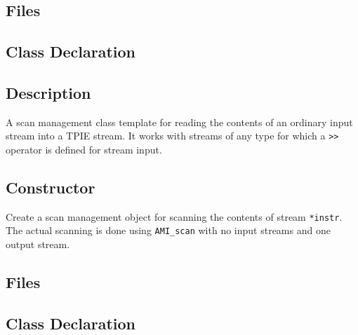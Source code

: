 


\clearpage

\subsection{Files}
  \btabb
     {}
  \etabb


\subsection{Class Declaration}
  \btabb
     {}
  \etabb

\subsection{Description}
A scan management class template for reading the contents of an
ordinary \CPP{} input stream into a TPIE stream.  It works with
streams of any type for which a \lstinline|>>| operator is defined for
\CPP{} stream input.

\subsection{Constructor}
\btabb {}
{Create a scan management object for scanning the contents of \CPP{}
  stream \lstinline|*instr|. The actual scanning is done using
  \lstinline|AMI_scan| with no input streams and one output stream.}
\etabb

\clearpage

\subsection{Files}
  \btabb
     {}
  \etabb


\subsection{Class Declaration}
\btabb {} {}
\etabb

